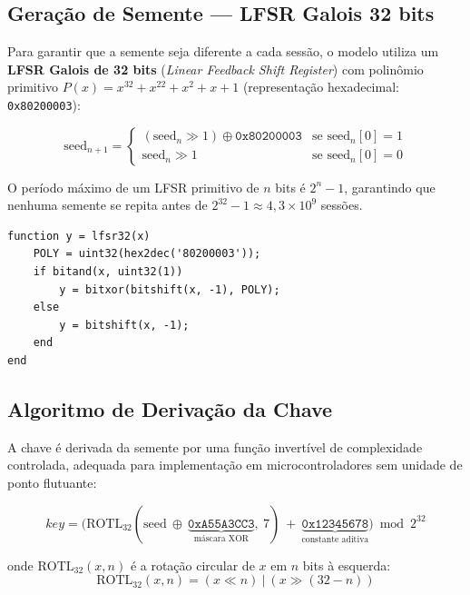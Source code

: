 \documentclass[12pt,a4paper]{article}
\begin{document}
\subsection{Geração de Semente --- LFSR Galois 32 bits}

Para garantir que a semente seja diferente a cada sessão, o modelo utiliza
um \textbf{LFSR Galois de 32 bits} (\textit{Linear Feedback Shift Register})
com polinômio primitivo $P(x) = x^{32} + x^{22} + x^2 + x + 1$
(representação hexadecimal: \texttt{0x80200003}):

\begin{equation}
    \text{seed}_{n+1} = \begin{cases}
        (\text{seed}_n \gg 1) \oplus \texttt{0x80200003}
            & \text{se } \text{seed}_n[0] = 1 \\[4pt]
        \text{seed}_n \gg 1
            & \text{se } \text{seed}_n[0] = 0
    \end{cases}
    \label{eq:lfsr}
\end{equation}

O período máximo de um LFSR primitivo de $n$ bits é $2^n - 1$, garantindo
que nenhuma semente se repita antes de $2^{32} - 1 \approx 4{,}3 \times 10^9$
sessões.

\begin{lstlisting}[style=mstyle, caption={LFSR-32 Galois --- MATLAB Function.}]
function y = lfsr32(x)
    POLY = uint32(hex2dec('80200003'));
    if bitand(x, uint32(1))
        y = bitxor(bitshift(x, -1), POLY);
    else
        y = bitshift(x, -1);
    end
end
\end{lstlisting}

\subsection{Algoritmo de Derivação da Chave}

A chave é derivada da semente por uma função invertível de complexidade
controlada, adequada para implementação em microcontroladores sem unidade
de ponto flutuante:

\begin{equation}
    \textit{key} = \bigl(\text{ROTL}_{32}(\text{seed}\ \oplus\
        \underbrace{\texttt{0xA55A3CC3}}_{\text{máscara XOR}},\ 7)\
        +\ \underbrace{\texttt{0x12345678}}_{\text{constante aditiva}}\bigr)
        \bmod 2^{32}
    \label{eq:seedkey}
\end{equation}

onde $\text{ROTL}_{32}(x, n)$ é a rotação circular de $x$ em $n$ bits à
esquerda:
\begin{equation}
    \text{ROTL}_{32}(x, n) = (x \ll n)\ |\ (x \gg (32 - n))
    \label{eq:rotl}
\end{equation}
\end{document}
